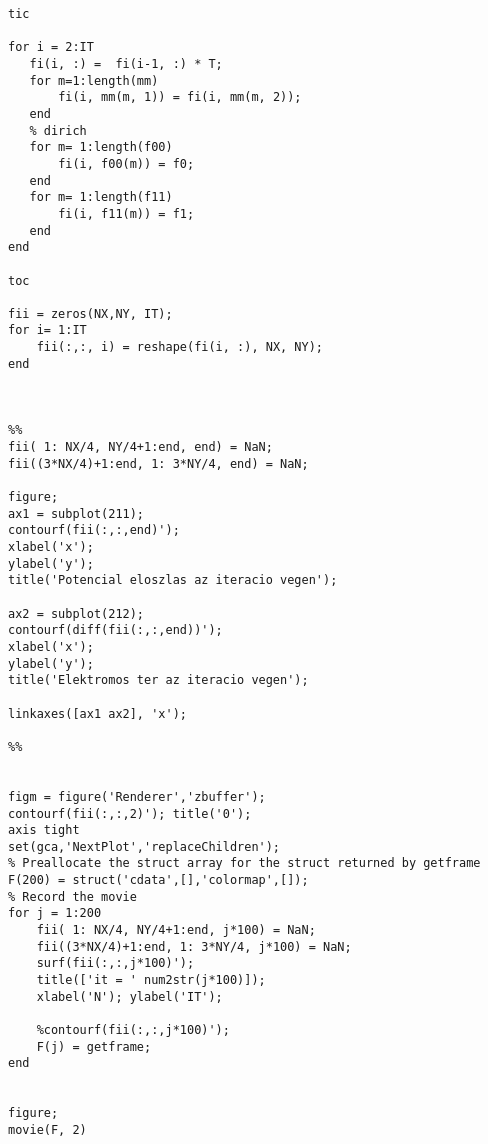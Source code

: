 \begin{lstlisting}[frame=single]
tic

for i = 2:IT
   fi(i, :) =  fi(i-1, :) * T;
   for m=1:length(mm)
       fi(i, mm(m, 1)) = fi(i, mm(m, 2));
   end
   % dirich
   for m= 1:length(f00)
       fi(i, f00(m)) = f0;
   end
   for m= 1:length(f11)
       fi(i, f11(m)) = f1;
   end
end

toc

fii = zeros(NX,NY, IT);
for i= 1:IT
    fii(:,:, i) = reshape(fi(i, :), NX, NY);
end



%%
fii( 1: NX/4, NY/4+1:end, end) = NaN;
fii((3*NX/4)+1:end, 1: 3*NY/4, end) = NaN;

figure;
ax1 = subplot(211);
contourf(fii(:,:,end)');
xlabel('x');
ylabel('y');
title('Potencial eloszlas az iteracio vegen');

ax2 = subplot(212);
contourf(diff(fii(:,:,end))');
xlabel('x');
ylabel('y');
title('Elektromos ter az iteracio vegen');

linkaxes([ax1 ax2], 'x');

%%


figm = figure('Renderer','zbuffer');
contourf(fii(:,:,2)'); title('0');
axis tight
set(gca,'NextPlot','replaceChildren');
% Preallocate the struct array for the struct returned by getframe
F(200) = struct('cdata',[],'colormap',[]);
% Record the movie
for j = 1:200
    fii( 1: NX/4, NY/4+1:end, j*100) = NaN;
    fii((3*NX/4)+1:end, 1: 3*NY/4, j*100) = NaN;
    surf(fii(:,:,j*100)');
    title(['it = ' num2str(j*100)]);
    xlabel('N'); ylabel('IT');
    
    %contourf(fii(:,:,j*100)'); 
    F(j) = getframe;
end


figure;
movie(F, 2)
\end{lstlisting}


